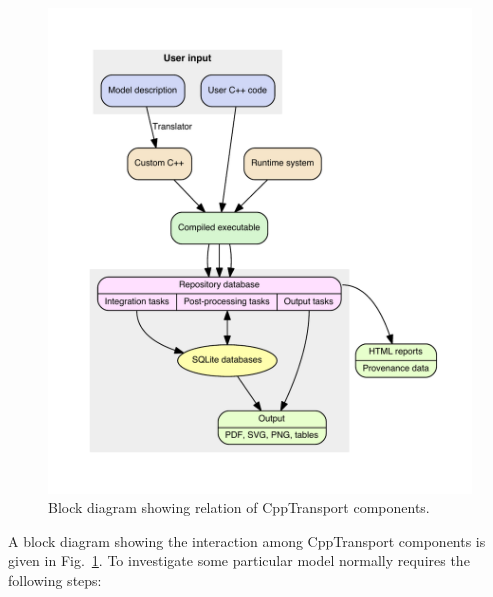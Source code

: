 \documentclass[11pt,a4paper]{article}
\newcommand{\packagefont}{\sffamily}
\newcommand{\CppTransport}{{\packagefont CppTransport}}
\begin{document}
\begin{figure}
    \begin{center}
        \includegraphics[scale=0.75]{Diagrams/organization}
    \end{center}
    \caption{\label{fig:organization}Block diagram showing relation
    of {\CppTransport} components.}
\end{figure}
A block diagram showing the interaction among {\CppTransport} components is given in
Fig.~\ref{fig:organization}.
To investigate some particular model normally requires the following steps:
\end{document}
